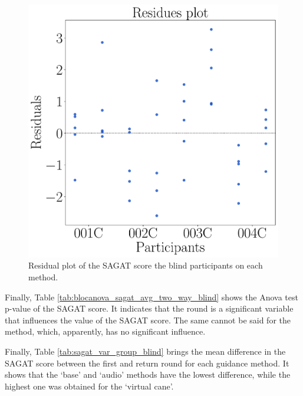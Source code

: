 \begin{figure}[!htb]
\begin{minipage}{0.45\textwidth}
        \includegraphics[width = 0.8\linewidth]{Resultados/Sagat/Figuras/pdf/residplot_sagat_avg_two_way_blind.pdf}
        \caption{Residual plot of the SAGAT score the blind participants on each method.}
        \label{fig:residplot_sagat_avg_two_way_blind}
    \end{minipage}
\end{figure}

Finally, Table \ref{tab:blocanova_sagat_avg_two_way_blind} shows the Anova test p-value of the SAGAT score. It indicates that the round is a significant variable that influences the value of the SAGAT score. The same cannot be said for the method, which, apparently, has no significant influence.



Finally, Table \ref{tab:sagat_var_group_blind} brings the mean difference in the SAGAT score between the first and return round for each guidance method. It shows that the ‘base’ and ‘audio’ methods have the lowest difference, while the highest one was obtained for the ‘virtual cane’.



\FloatBarrier